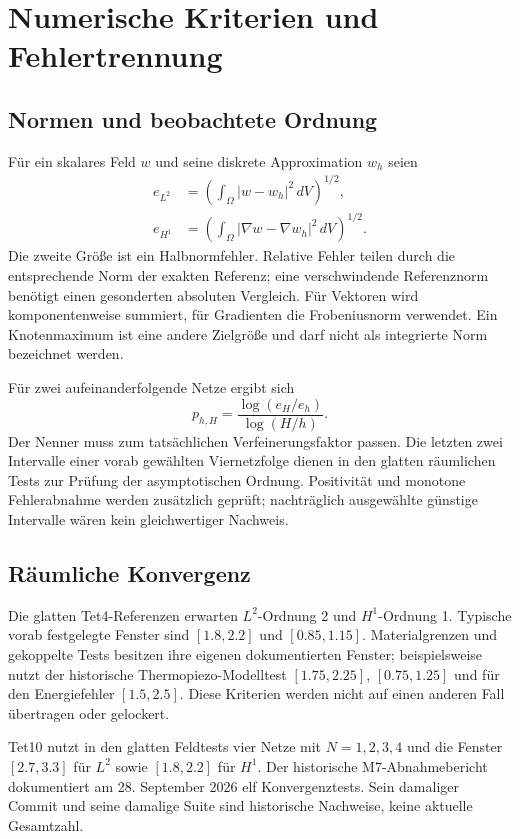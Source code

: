 \chapter{Numerische Kriterien und Fehlertrennung}
\section{Normen und beobachtete Ordnung}
Für ein skalares Feld $w$ und seine diskrete Approximation $w_h$ seien
\begin{align}
 e_{L^2}&=\left(\int_\Omega |w-w_h|^2\,dV\right)^{1/2},\\
 e_{H^1}&=\left(\int_\Omega |\nabla w-\nabla w_h|^2\,dV\right)^{1/2}.
\end{align}
Die zweite Größe ist ein Halbnormfehler. Relative Fehler teilen durch die
entsprechende Norm der exakten Referenz; eine verschwindende Referenznorm
benötigt einen gesonderten absoluten Vergleich. Für Vektoren wird komponentenweise
summiert, für Gradienten die Frobeniusnorm verwendet. Ein Knotenmaximum ist
eine andere Zielgröße und darf nicht als integrierte Norm bezeichnet werden.

Für zwei aufeinanderfolgende Netze ergibt sich
\begin{equation}
 p_{h,H}=\frac{\log(e_H/e_h)}{\log(H/h)}.
\end{equation}
Der Nenner muss zum tatsächlichen Verfeinerungsfaktor passen. Die letzten zwei
Intervalle einer vorab gewählten Viernetzfolge dienen in den glatten räumlichen
Tests zur Prüfung der asymptotischen Ordnung. Positivität und monotone
Fehlerabnahme werden zusätzlich geprüft; nachträglich ausgewählte günstige
Intervalle wären kein gleichwertiger Nachweis.

\section{Räumliche Konvergenz}
Die glatten Tet4-Referenzen erwarten $L^2$-Ordnung 2 und $H^1$-Ordnung 1.
Typische vorab festgelegte Fenster sind $[1.8,2.2]$ und $[0.85,1.15]$.
Materialgrenzen und gekoppelte Tests besitzen ihre eigenen dokumentierten
Fenster; beispielsweise nutzt der historische Thermopiezo-Modelltest
$[1.75,2.25]$, $[0.75,1.25]$ und für den Energiefehler $[1.5,2.5]$.
Diese Kriterien werden nicht auf einen anderen Fall übertragen oder gelockert.

Tet10 nutzt in den glatten Feldtests vier Netze mit $N=1,2,3,4$ und die Fenster
$[2.7,3.3]$ für $L^2$ sowie $[1.8,2.2]$ für $H^1$. Der historische
M7-Abnahmebericht  dokumentiert am
28. September 2026 elf Konvergenztests. Sein damaliger Commit und seine damalige
Suite sind historische Nachweise, keine aktuelle Gesamtzahl.

